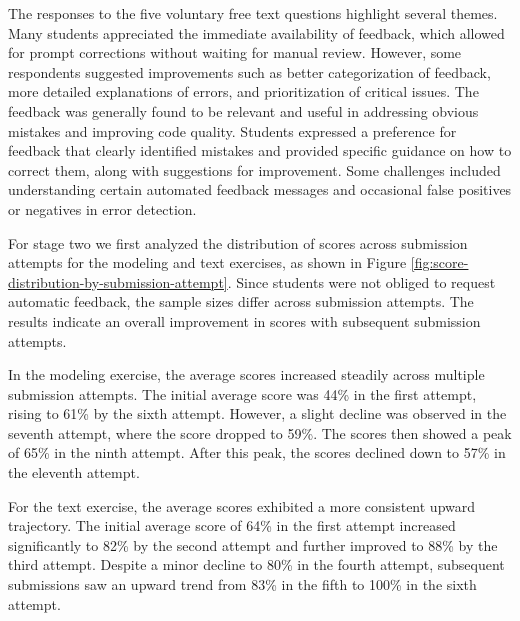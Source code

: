 \documentclass[sigconf,screen,review,anonymous]{acmart}
\begin{document}
The responses to the five voluntary free text questions highlight several themes.
Many students appreciated the immediate availability of feedback, which allowed for prompt corrections without waiting for manual review. 
However, some respondents suggested improvements such as better categorization of feedback, more detailed explanations of errors, and prioritization of critical issues. 
The feedback was generally found to be relevant and useful in addressing obvious mistakes and improving code quality. 
Students expressed a preference for feedback that clearly identified mistakes and provided specific guidance on how to correct them, along with suggestions for improvement. 
Some challenges included understanding certain automated feedback messages and occasional false positives or negatives in error detection.


For stage two we first analyzed the distribution of scores across submission attempts for the modeling and text exercises, as shown in Figure \ref{fig:score-distribution-by-submission-attempt}.
Since students were not obliged to request automatic feedback, the sample sizes differ across submission attempts.
The results indicate an overall improvement in scores with subsequent submission attempts.

In the modeling exercise, the average scores increased steadily across multiple submission attempts.
The initial average score was 44\% in the first attempt, rising to 61\% by the sixth attempt.
However, a slight decline was observed in the seventh attempt, where the score dropped to 59\%.
The scores then showed a peak of 65\% in the ninth attempt.
After this peak, the scores declined down to 57\% in the eleventh attempt.

For the text exercise, the average scores exhibited a more consistent upward trajectory.
The initial average score of 64\% in the first attempt increased significantly to 82\% by the second attempt and further improved to 88\% by the third attempt.
Despite a minor decline to 80\% in the fourth attempt, subsequent submissions saw an upward trend from 83\% in the fifth to 100\% in the sixth attempt.
\end{document}
